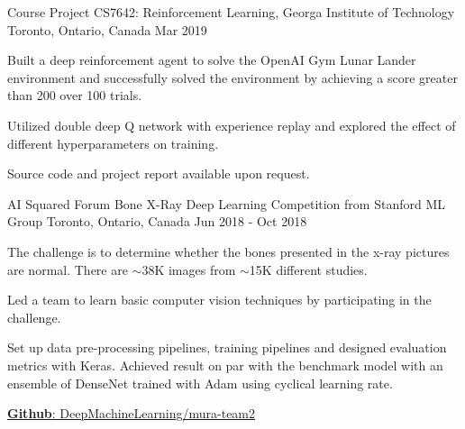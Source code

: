 


\begin{cventries}

  \cventry
    {Course Project} %
    {CS7642: Reinforcement Learning, Georga Institute of Technology} %
    {Toronto, Ontario, Canada} %
    {Mar 2019} %
    {
      \begin{cvitems} %
        \item {Built a deep reinforcement agent to solve the OpenAI Gym Lunar Lander environment and successfully solved the environment by achieving a score greater than 200 over 100 trials.}
        \item {Utilized double deep Q network with experience replay and explored the effect of different hyperparameters on training.}
        \item {Source code and project report available upon request.}
      \end{cvitems}
    }

\end{cventries}

\begin{cventries}

  \cventry
    {AI Squared Forum} %
    {Bone X-Ray Deep Learning Competition from Stanford ML Group} %
    {Toronto, Ontario, Canada} %
    {Jun 2018 - Oct 2018} %
    {
      \begin{cvitems} %
        \item {The challenge is to determine whether the bones presented in the x-ray pictures are normal. There are $\sim$38K images from $\sim$15K different studies.}
        \item {Led a team to learn basic computer vision techniques by participating in the challenge.}
        \item {Set up data pre-processing pipelines, training pipelines and designed evaluation metrics with Keras. Achieved result on par with the benchmark model with an ensemble of DenseNet trained with Adam using cyclical learning rate.}
        \item \href{https://github.com/DeepMachineLearning/mura-team2}{\textbf{Github}: DeepMachineLearning/mura-team2}
      \end{cvitems}
    }

\end{cventries}
